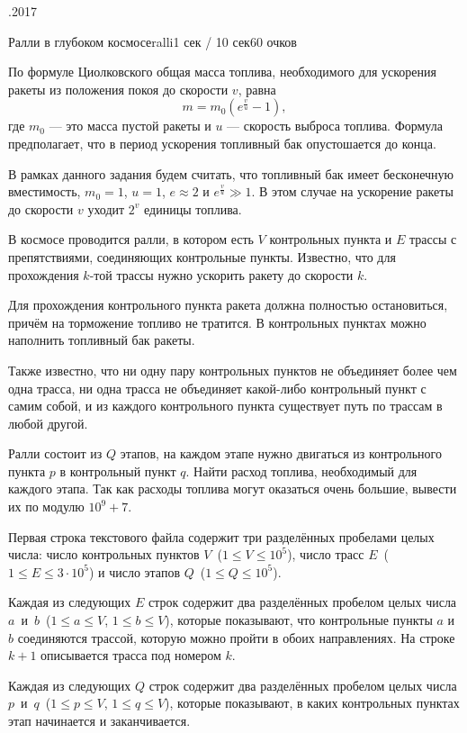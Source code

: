 \documentclass[a4paper,10pt]{article}
\begin{document}
\begin{ol}{\eio}{.2017}{\yle}{}
\begin{yl}{5}{Ралли в глубоком космосе}{ralli}{1 сек / 10 сек}{60 очков}

По формуле Циолковского общая масса топлива, необходимого для ускорения ракеты из положения покоя до скорости $v$, равна
\[
  m = m_0\left(e^{\frac{v}{u}} - 1\right),
\]
где $m_0$ --- это масса пустой ракеты и $u$ --- скорость выброса топлива. Формула предполагает, что в период ускорения топливный бак опустошается до конца.

В рамках данного задания будем считать, что топливный бак имеет бесконечную вместимость, $m_0 = 1$, $u = 1$, $e \approx 2$ и $e^{\frac{v}{u}} \gg 1$. В этом случае на ускорение ракеты до скорости $v$ уходит $2^{v}$ единицы топлива.

В космосе проводится ралли, в котором есть $V$ контрольных пункта и $E$ трассы с препятствиями, соединяющих контрольные пункты. Известно, что для прохождения $k$-той трассы нужно ускорить ракету до скорости $k$.

Для прохождения контрольного пункта ракета должна полностью остановиться, причём на торможение топливо не тратится. В контрольных пунктах можно наполнить топливный бак ракеты.

Также известно, что ни одну пару контрольных пунктов не объединяет более чем одна трасса, ни одна трасса не объединяет какой-либо контрольный пункт с самим собой, и из каждого контрольного пункта существует путь по трассам в любой другой.

Ралли состоит из $Q$ этапов, на каждом этапе нужно двигаться из контрольного пункта $p$ в контрольный пункт $q$. Найти расход топлива, необходимый для каждого этапа. Так как расходы топлива могут оказаться очень большие, вывести их по модулю $10^9 + 7$.

\sis Первая строка текстового файла \sisf содержит три разделённых пробелами целых числа: число контрольных пунктов $V$~($1 \le V \le 10^5$), число трасс $E$~($1 \le E \le 3 \cdot 10^5$) и число этапов $Q$~($1 \le Q \le 10^5$).

Каждая из следующих $E$ строк содержит два разделённых пробелом целых числа $a$~и~$b$~($1 \le a \le V$, $1 \le b \le V$), которые показывают, что контрольные пункты $a$ и $b$ соединяются трассой, которую можно пройти в обоих направлениях. На строке $k + 1$ описывается трасса под номером $k$.

Каждая из следующих $Q$ строк содержит два разделённых пробелом целых числа $p$~и~$q$~($1 \le p \le V$, $1 \le q \le V$), которые показывают, в каких контрольных пунктах этап начинается и заканчивается.


\end{yl}
\end{ol}
\end{document}
